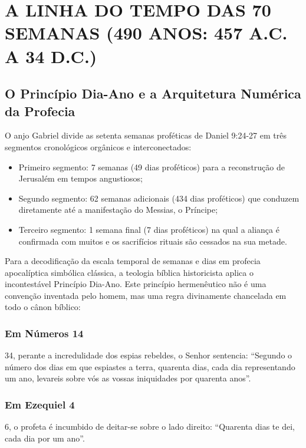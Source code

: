 \documentclass[11pt,a4paper,openany]{book}
\begin{document}
\section{A LINHA DO TEMPO DAS 70 SEMANAS (490 ANOS: 457 A.C. A 34 D.C.)}



\subsection{O Princípio Dia-Ano e a Arquitetura Numérica da Profecia}


O anjo Gabriel divide as setenta semanas proféticas de Daniel 9:24-27 em três segmentos cronológicos orgânicos e interconectados:
\begin{itemize}
  \item Primeiro segmento: 7 semanas (49 dias proféticos) para a reconstrução de Jerusalém em tempos angustiosos;
  \item Segundo segmento: 62 semanas adicionais (434 dias proféticos) que conduzem diretamente até a manifestação do Messias, o Príncipe;
  \item Terceiro segmento: 1 semana final (7 dias proféticos) na qual a aliança é confirmada com muitos e os sacrifícios rituais são cessados na sua metade.
\end{itemize}


Para a decodificação da escala temporal de semanas e dias em profecia apocalíptica simbólica clássica, a teologia bíblica historicista aplica o incontestável Princípio Dia-Ano. Este princípio hermenêutico não é uma convenção inventada pelo homem, mas uma regra divinamente chancelada em todo o cânon bíblico:

\subsubsection*{Em Números 14}
34, perante a incredulidade dos espias rebeldes, o Senhor sentencia: ``Segundo o número dos dias em que espiastes a terra, quarenta dias, cada dia representando um ano, levareis sobre vós as vossas iniquidades por quarenta anos''.

\subsubsection*{Em Ezequiel 4}
6, o profeta é incumbido de deitar-se sobre o lado direito: ``Quarenta dias te dei, cada dia por um ano''.
\end{document}
